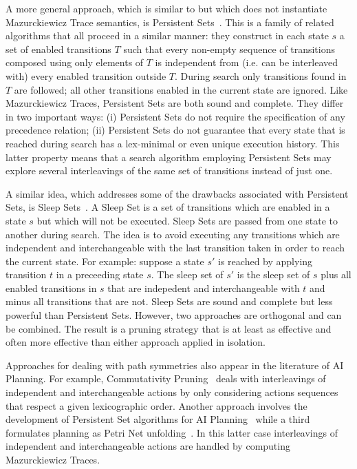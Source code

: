 A more general approach, which is similar to but which does not instantiate Mazurckiewicz Trace semantics, 
is Persistent Sets~\citep{godefroid96}. This is a family of related algorithms that all proceed in a 
similar manner: 
they construct in each state $s$ a set of enabled transitions $T$ such that every
non-empty sequence of transitions composed using only elements of $T$ is independent from (i.e. can be
interleaved with) every enabled transition outside $T$. During search only transitions
found in $T$ are followed; all other transitions enabled in the current state are ignored.
Like Mazurckiewicz Traces, Persistent Sets are both sound and complete. They differ
in two important ways: (i) Persistent Sets do not require the specification of any precedence relation; 
(ii) Persistent Sets do not guarantee that every state that is reached during search has a lex-minimal 
or even unique execution history. This latter property means that a search algorithm employing
Persistent Sets may explore several interleavings of the same set of transitions instead of just one.

A similar idea, which addresses some of the drawbacks associated with Persistent Sets, is 
Sleep Sets~\citep{godefroid96}. A Sleep Set is a set of transitions which are
enabled in a state $s$ but which will not be executed. Sleep Sets are passed from one state to 
another during search. The idea is to avoid executing any transitions which are independent and
interchangeable with the last transition taken in order to reach the current state.
For example: suppose a state $s'$ is reached by applying transition $t$ in a preceeding state $s$.
The sleep set of $s'$ is the sleep set of $s$ plus all enabled transitions in $s$ that 
are indepedent and interchangeable with $t$ and minus all transitions that are not.
Sleep Sets are sound and complete but less powerful than Persistent Sets. However, two approaches 
are orthogonal and can be combined. The result is a pruning strategy that is at least as effective
and often more effective than either approach applied in isolation.

Approaches for dealing with path symmetries also appear in the literature of AI Planning.  For
example, Commutativity Pruning~\citep{haslum00} deals with interleavings of independent and
interchangeable actions by only considering actions sequences that respect a given lexicographic
order.  Another approach involves the development of Persistent Set algorithms for AI
Planning~\citep{alkhazraji12,wehrle12} while a third formulates planning as Petri Net
unfolding~\citep{hickmott07}. In this latter case interleavings of independent and interchangeable
actions are handled by computing Mazurckiewicz Traces.

